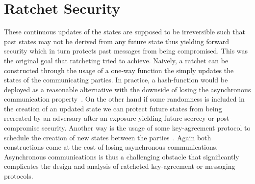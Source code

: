 \documentclass[11pt,a4paper,twoside,openright,bibliography=totoc]{scrbook}
\begin{document}
\section{Ratchet Security}
\label{sec:ratchet-security}

These continuous updates of the states are supposed to be irreversible
such that past states may not be derived from any future state thus
yielding forward security which in turn protects past messages from being
compromised. This was the original goal that ratcheting tried to
achieve. Naively, a ratchet can be constructed through the usage of a
one-way function the simply updates the states of the communicating
parties. In practice, a hash-function would be deployed as a
reasonable alternative with the downside of losing the asynchronous
communication property~\cite{bellare2003forward}. On the other hand if
some randomness is included in the creation of an updated state we can
protect future states from being recreated by an adversary after an
exposure yielding future secrecy or post-compromise security. Another
way is the usage of some key-agreement protocol to schedule the
creation of new states between the parties~\cite{cohn2016post}. Again
both constructions come at the cost of losing asynchronous
communications. Asynchronous communications is thus a challenging
obstacle that significantly complicates the design and analysis
of ratcheted key-agreement or messaging protocols.

\bigskip
\end{document}
